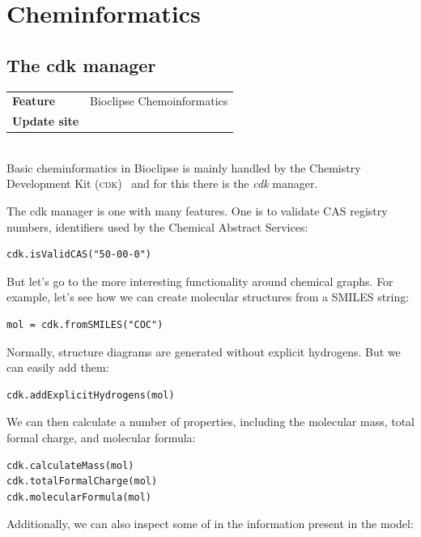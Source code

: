 \documentclass[a5paper, 10pt]{memoir}
\begin{document}
\chapter{Cheminformatics}
\begin{refsection}


\section{The cdk manager}

\begin{tabular}{ll}
\textbf{Feature} & Bioclipse Chemoinformatics \\
\textbf{Update site} & \url{} \\
\end{tabular} \\

\noindent
Basic cheminformatics in Bioclipse is mainly handled by the Chemistry
Development Kit
(\textsc{cdk})~\cite{Steinbeck2003,Steinbeck2006} and for this there is the
\emph{cdk} manager.

The cdk manager is one with many features. One is to validate
\textsc{CAS} registry numbers, identifiers used by the Chemical Abstract
Services:

\begin{Verbatim}
cdk.isValidCAS("50-00-0")
\end{Verbatim}

But let's go to the more interesting functionality around chemical graphs. For
example, let's see how we can create molecular structures from a SMILES
string:

\begin{Verbatim}
mol = cdk.fromSMILES("COC")
\end{Verbatim}
Normally, structure diagrams are generated without explicit hydrogens. But we
can easily add them:

\begin{Verbatim}
cdk.addExplicitHydrogens(mol)
\end{Verbatim}
We can then calculate a number of properties, including the molecular
mass, total formal charge, and molecular
formula:

\begin{Verbatim}
cdk.calculateMass(mol)
cdk.totalFormalCharge(mol)
cdk.molecularFormula(mol)
\end{Verbatim}
Additionally, we can also inspect some of in the information present in the
model:


\end{refsection}
\end{document}
